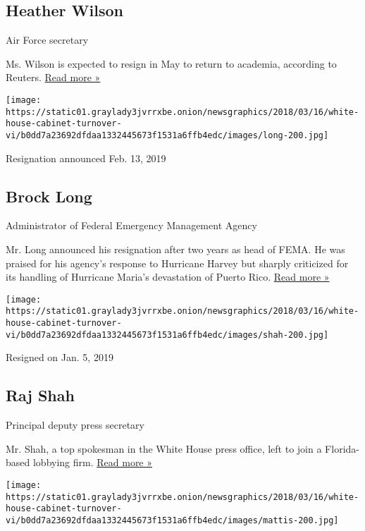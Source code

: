 \hypertarget{heather-wilson}{%
\subsection{Heather Wilson}\label{heather-wilson}}

Air Force secretary

Ms. Wilson is expected to resign in May to return to academia, according
to Reuters.
\href{https://www.nytimes3xbfgragh.onion/2019/03/08/us/politics/heather-wilson-air-force-.html}{Read
more »}

\texttt{[image: https://static01.graylady3jvrrxbe.onion/newsgraphics/2018/03/16/white-house-cabinet-turnover-vi/b0dd7a23692dfdaa1332445673f1531a6ffb4edc/images/long-200.jpg]}

Resignation announced Feb. 13, 2019

\hypertarget{brock-long}{%
\subsection{Brock Long}\label{brock-long}}

Administrator of Federal Emergency Management Agency

Mr. Long announced his resignation after two years as head of FEMA. He
was praised for his agency's response to Hurricane Harvey but sharply
criticized for its handling of Hurricane Maria's devastation of Puerto
Rico.
\href{https://www.nytimes3xbfgragh.onion/2019/02/13/us/politics/brock-long-fema.html}{Read
more »}

\texttt{[image: https://static01.graylady3jvrrxbe.onion/newsgraphics/2018/03/16/white-house-cabinet-turnover-vi/b0dd7a23692dfdaa1332445673f1531a6ffb4edc/images/shah-200.jpg]}

Resigned on Jan. 5, 2019

\hypertarget{raj-shah}{%
\subsection{Raj Shah}\label{raj-shah}}

Principal deputy press secretary

Mr. Shah, a top spokesman in the White House press office, left to join
a Florida-based lobbying firm.
\href{https://www.nytimes3xbfgragh.onion/2019/01/14/us/politics/raj-shah-leaves-white-house.html}{Read
more »}

\texttt{[image: https://static01.graylady3jvrrxbe.onion/newsgraphics/2018/03/16/white-house-cabinet-turnover-vi/b0dd7a23692dfdaa1332445673f1531a6ffb4edc/images/mattis-200.jpg]}


